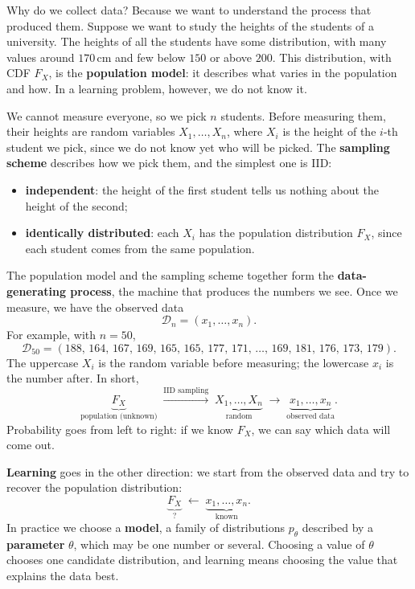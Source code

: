 \documentclass[a4paper,12pt,oneside]{report}
\begin{document}
Why do we collect data? Because we want to understand the process that
produced them. Suppose we want to study the heights of the students of a
university. The heights of all the students have some distribution, with
many values around $170$\,cm and few below $150$ or above $200$. This
distribution, with CDF $F_X$, is the \textbf{population model}: it describes
what varies in the population and how. In a learning problem, however, we do
not know it.

We cannot measure everyone, so we pick $n$ students. Before measuring them,
their heights are random variables $X_1,\ldots,X_n$, where $X_i$ is the
height of the $i$-th student we pick, since we do not know yet who will be
picked. The \textbf{sampling scheme} describes how we pick
them, and the simplest one is IID:
\begin{itemize}
\item \textbf{independent}: the height of the first student tells us nothing
about the height of the second;
\item \textbf{identically distributed}: each $X_i$ has the population
distribution $F_X$, since each student comes from the same population.
\end{itemize}

The population model and the sampling scheme together form the
\textbf{data-generating process}, the machine that produces the numbers we
see. Once we measure, we have the observed data
\[
\mathcal{D}_n=(x_1,\ldots,x_n).
\]
For example, with $n=50$,
\[
\mathcal{D}_{50}=(188,\,164,\,167,\,169,\,165,\,165,\,177,\,171,\,
\ldots,\,169,\,181,\,176,\,173,\,179).
\]
The uppercase $X_i$ is the random variable before measuring; the lowercase
$x_i$ is the number after. In short,
\[
\underbrace{F_X}_{\text{population (unknown)}}
\;\xrightarrow{\text{IID sampling}}\;
\underbrace{X_1,\ldots,X_n}_{\text{random}}
\;\longrightarrow\;
\underbrace{x_1,\ldots,x_n}_{\text{observed data}}.
\]
Probability goes from left to right: if we know $F_X$, we can say which data
will come out.

\textbf{Learning} goes in the other direction: we start from the observed
data and try to recover the population distribution:
\[
\underbrace{F_X}_{\text{?}}\;\longleftarrow\;\underbrace{x_1,\ldots,x_n}_{\text{known}}.
\]
In practice we choose a
\textbf{model}, a family of distributions $p_\theta$ described by a
\textbf{parameter} $\theta$, which may be one number or several. Choosing a
value of $\theta$ chooses one candidate distribution, and learning means
choosing the value that explains the data best.
\end{document}
